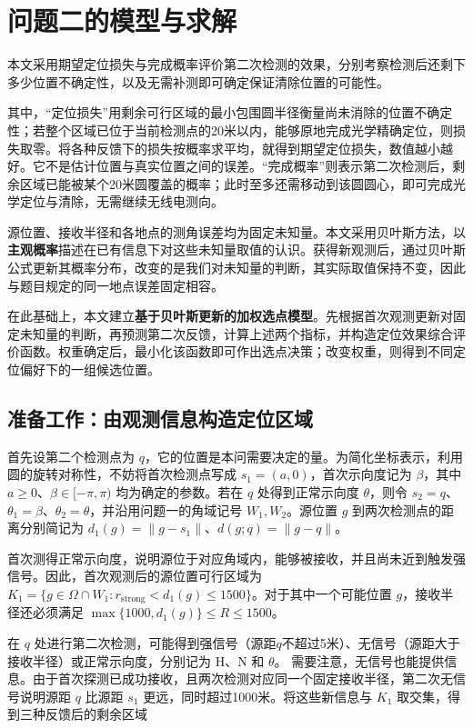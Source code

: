 \section{问题二的模型与求解}

本文采用期望定位损失与完成概率评价第二次检测的效果，分别考察检测后还剩下多少位置不确定性，以及无需补测即可确定保证清除位置的可能性。

其中，“定位损失”用剩余可行区域的最小包围圆半径衡量尚未消除的位置不确定性；若整个区域已位于当前检测点的20米以内，能够原地完成光学精确定位，则损失取零。将各种反馈下的损失按概率求平均，就得到期望定位损失，数值越小越好。它不是估计位置与真实位置之间的误差。“完成概率”则表示第二次检测后，剩余区域已能被某个20米圆覆盖的概率；此时至多还需移动到该圆圆心，即可完成光学定位与清除，无需继续无线电测向。

源位置、接收半径和各地点的测角误差均为固定未知量。本文采用贝叶斯方法，以\textbf{主观概率}描述在已有信息下对这些未知量取值的认识。获得新观测后，通过贝叶斯公式更新其概率分布，改变的是我们对未知量的判断，其实际取值保持不变，因此与题目规定的同一地点误差固定相容。

在此基础上，本文建立\textbf{基于贝叶斯更新的加权选点模型}。先根据首次观测更新对固定未知量的判断，再预测第二次反馈，计算上述两个指标，并构造定位效果综合评价函数。权重确定后，最小化该函数即可作出选点决策；改变权重，则得到不同定位偏好下的一组候选位置。

\subsection{准备工作：由观测信息构造定位区域}

首先设第二个检测点为 \(q\)，它的位置是本问需要决定的量。为简化坐标表示，利用圆的旋转对称性，不妨将首次检测点写成 \(s_1=(a,0)\)，首次示向度记为 \(\beta\)，其中 \(a\ge0\)、\(\beta\in[-\pi,\pi)\) 均为确定的参数。若在 \(q\) 处得到正常示向度 \(\theta\)，则令 \(s_2=q\)、\(\theta_1=\beta\)、\(\theta_2=\theta\)，并沿用问题一的角域记号 \(W_1,W_2\)。源位置 \(g\) 到两次检测点的距离分别简记为 \(d_1(g)=\|g-s_1\|\)、\(d(g;q)=\|g-q\|\)。

首次测得正常示向度，说明源位于对应角域内，能够被接收，并且尚未近到触发强信号。因此，首次观测后的源位置可行区域为 \(K_1=\{g\in\Omega\cap W_1:r_{\mathrm{strong}}<d_1(g)\le1500\}\)。对于其中一个可能位置 \(g\)，接收半径还必须满足 \(\max\{1000,d_1(g)\}\le R\le1500\)。

在 \(q\) 处进行第二次检测，可能得到强信号（源距\(q\)不超过5米）、无信号（源距大于接收半径）或正常示向度，分别记为 \(\mathrm H\)、\(\mathrm N\) 和 \(\theta\)。
需要注意，无信号也能提供信息。由于首次探测已成功接收，且两次检测对应同一个固定接收半径，第二次无信号说明源距 \(q\) 比源距 \(s_1\) 更远，同时超过1000米。将这些新信息与 \(K_1\) 取交集，得到三种反馈后的剩余区域

